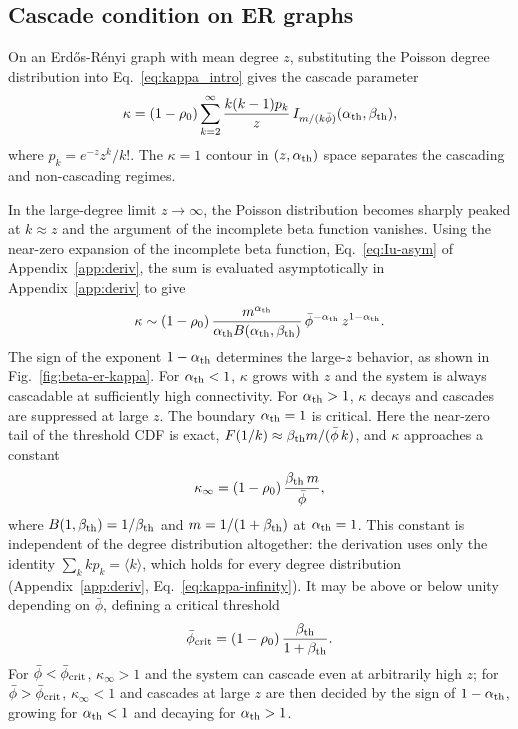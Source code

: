 \documentclass[]{revtex4-2}
\begin{document}
\subsection{Cascade condition on ER graphs}

On an Erd\H{o}s-R\'{e}nyi graph with mean degree $z$, substituting the Poisson degree distribution into Eq.~\eqref{eq:kappa_intro} gives the cascade parameter
\begin{equation}
    \kappa = (1-\rho_0)\sum_{k=2}^\infty \frac{k(k-1)p_k}{z}\,
    I_{m/(k\bar\phi)}(\alpha_{\rm th},\beta_{\rm th}),
\end{equation}
where $p_k = e^{-z}z^k/k!$. The $\kappa=1$ contour in $(z,\alpha_{\rm th})$ space separates the cascading and non-cascading regimes.

In the large-degree limit $z\to\infty$, the Poisson distribution becomes sharply peaked at $k\approx z$ and the argument of the incomplete beta function vanishes. Using the near-zero expansion of the incomplete beta function, Eq.~\eqref{eq:Iu-asym} of Appendix~\ref{app:deriv}, the sum is evaluated asymptotically in Appendix~\ref{app:deriv} to give
\begin{equation}
    \kappa \sim (1-\rho_0)\,\frac{m^{\alpha_{\rm th}}}{\alpha_{\rm th} B(\alpha_{\rm th},\beta_{\rm th})}\,
    \bar\phi^{-\alpha_{\rm th}}\,z^{1-\alpha_{\rm th}} .
    \label{eq:er-asym}
\end{equation}
The sign of the exponent $1-\alpha_{\rm th}$ determines the large-$z$ behavior, as shown in Fig.~\ref{fig:beta-er-kappa}. For $\alpha_{\rm th}<1$, $\kappa$ grows with $z$ and the system is always cascadable at sufficiently high connectivity. For $\alpha_{\rm th}>1$, $\kappa$ decays and cascades are suppressed at large $z$. The boundary $\alpha_{\rm th}=1$ is critical. Here the near-zero tail of the threshold CDF is exact, $F(1/k)\approx \beta_{\rm th} m/(\bar\phi\,k)$, and $\kappa$ approaches a constant
\begin{equation}
    \kappa_\infty = (1-\rho_0)\,\frac{\beta_{\rm th}\,m}{\bar\phi},
    \label{eq:kappa-infinity}
\end{equation}
where $B(1,\beta_{\rm th})=1/\beta_{\rm th}$ and $m=1/(1+\beta_{\rm th})$ at $\alpha_{\rm th}=1$. This constant is independent of the degree distribution altogether: the derivation uses only the identity $\sum_k k p_k = \langle k\rangle$, which holds for every degree distribution (Appendix~\ref{app:deriv}, Eq.~\eqref{eq:kappa-infinity}). It may be above or below unity depending on $\bar\phi$, defining a critical threshold
\begin{equation}
    \bar\phi_{\rm crit} = (1-\rho_0)\,\frac{\beta_{\rm th}}{1+\beta_{\rm th}} .
    \label{eq:phi-crit}
\end{equation}
For $\bar\phi<\bar\phi_{\rm crit}$, $\kappa_\infty>1$ and the system can cascade even at arbitrarily high $z$; for $\bar\phi>\bar\phi_{\rm crit}$, $\kappa_\infty<1$ and cascades at large $z$ are then decided by the sign of $1-\alpha_{\rm th}$, growing for $\alpha_{\rm th}<1$ and decaying for $\alpha_{\rm th}>1$.
\end{document}

